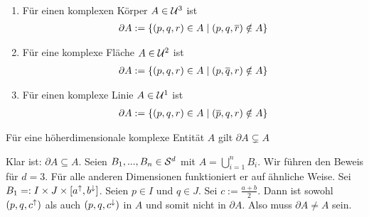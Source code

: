 \begin{dfn}\ 
    \begin{enumerate}
        \item Für einen komplexen Körper $A \in \mathcal{U}^3$ ist
            \begin{align*}
                \partial A := \{(p,q,r) \in A \mid (p,q,\overline{r}) \notin A\}
            \end{align*}
        \item Für eine komplexe Fläche $A \in \mathcal{U}^2$ ist
            \begin{align*}
                \partial A := \{(p,q,r) \in A \mid (p,\overline{q},r) \notin A\}
            \end{align*}
        \item Für einen komplexe Linie $A \in \mathcal{U}^1$ ist
            \begin{align*}
                \partial A := \{(p,q,r) \in A \mid (\overline{p},q,r) \notin A\}
            \end{align*}
    \end{enumerate}
\end{dfn}

\begin{satz}\label{satz:rand-teil}
    Für eine höherdimensionale komplexe Entität $A$ gilt $\partial A \subsetneq A$
\end{satz}

\begin{bew}
    Klar ist: $\partial A \subseteq A$.
    Seien $B_1, ..., B_n \in \mathcal{S}^d$ mit $A = \bigcup_{i=1}^{n}B_i$.
    Wir führen den Beweis für $d=3$. Für alle anderen Dimensionen funktioniert er auf ähnliche Weise.
    Sei $B_1 =: I \times J \times [a^{\uparrow}, b^{\downarrow}]$.
    Seien $p \in I$ und $q \in J$. Sei $c := \frac{a+b}{2}$. 
    Dann ist sowohl $(p,q,c^{\uparrow})$ als auch $(p,q,c^{\downarrow})$ in $A$ und somit nicht in $\partial A$.
    Also muss $\partial A \neq A$ sein.
\end{bew}











